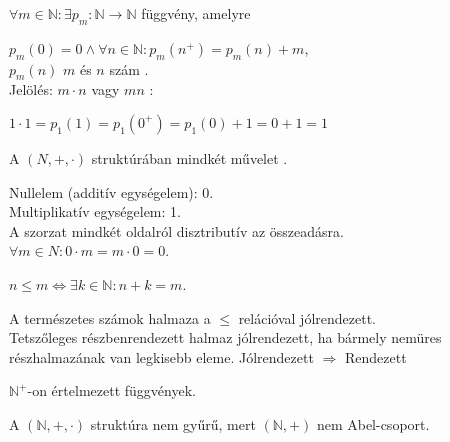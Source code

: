 \begin{frame}
  \begin{tcolorbox}[title={Def.: Szorzás}]
    ${\forall}m \in \mathbb{N} : {\exists} p_m : \mathbb{N} \rightarrow \mathbb{N}$ függvény, amelyre\\
    \mmedskip

    $p_m(0) = 0 \land {\forall}n\in \mathbb{N} : p_m(n^+) = p_m(n) + m$,\\
    $p_m(n)$ $m$ és $n$ szám .\\
    Jelölés: $m \cdot n$ vagy $mn$
  \tcblower
    :\\
    \mmedskip
    
    $1 \cdot 1 = p_1(1) = p_1(0^+) = p_1(0) + 1 = 0 + 1 = 1$
  \end{tcolorbox}
\end{frame}

\begin{frame}
  \begin{tcolorbox}[title={Tétel: Természetes számok}]
    A $(N, +, {\cdot})$ struktúrában mindkét művelet .\\
    \msmallskip
    
    Nullelem (additív egységelem): 0.\\
    Multiplikatív egységelem: 1.\\
    A szorzat mindkét oldalról disztributív az összeadásra.\\
    ${\forall}m \in N : 0 \cdot m = m \cdot 0 = 0$.
  \end{tcolorbox}
\end{frame}

\begin{frame}
\begin{tcolorbox}[title={Def.: $\mathbb{N}$ rendezése}]
  $n \leq m \iff {\exists}k \in \mathbb{N}: n + k = m$.
\end{tcolorbox}

\begin{tcolorbox}[title={Tétel: N rendezése}]
A természetes számok halmaza a $\leq$ relációval jólrendezett.\\
{\footnotesize Tetszőleges részbenrendezett halmaz jólrendezett, ha bármely nemüres részhalmazának van legkisebb eleme. Jólrendezett $\Rightarrow$ Rendezett}
\end{tcolorbox}

\begin{tcolorbox}[title={Def.: Végtelen sorozatok}]
  $\mathbb{N}^+$-on értelmezett függvények.
\end{tcolorbox}


\begin{tcolorbox}[title={Ész}]
  A $(\mathbb{N}, +, {\cdot})$ struktúra nem gyűrű, mert $(\mathbb{N}, +)$ nem Abel-csoport.
\end{tcolorbox}
\end{frame}

